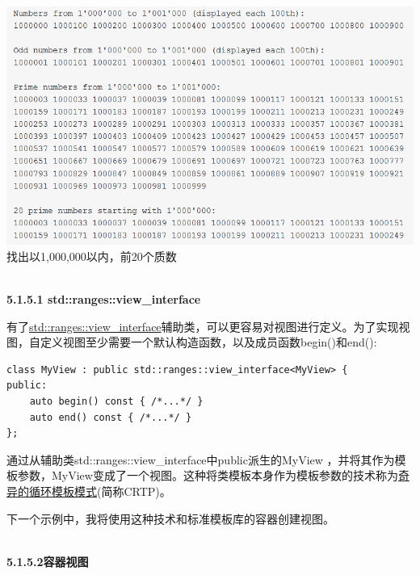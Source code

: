 \begin{center}
\includegraphics[width=1.0\textwidth]{content/3/chapter5/images/1-2.png}\\
找出以1,000,000以内，前20个质数
\end{center}


\hspace*{\fill} \\ %
\noindent
\textbf{5.1.5.1\hspace{0.2cm} std::ranges::view\_interface}

有了\href{https://en.cppreference.com/w/cpp/ranges/view_interface}{std::ranges::view\_interface}辅助类，可以更容易对视图进行定义。为了实现视图，自定义视图至少需要一个默认构造函数，以及成员函数begin()和end():

\begin{lstlisting}[style=styleCXX]
class MyView : public std::ranges::view_interface<MyView> {
public:
	auto begin() const { /*...*/ }
	auto end() const { /*...*/ }
};
\end{lstlisting}

通过从辅助类std::ranges::view\_interface中public派生的MyView ，并将其作为模板参数，MyView变成了一个视图。这种将类模板本身作为模板参数的技术称为\href{https://www.modernescpp.com/index.php/c-is-still-lazy}{奇异的循环模板模式}(简称CRTP)。

下一个示例中，我将使用这种技术和标准模板库的容器创建视图。

\hspace*{\fill} \\ %
\noindent
\textbf{5.1.5.2\hspace{0.2cm}容器视图}

